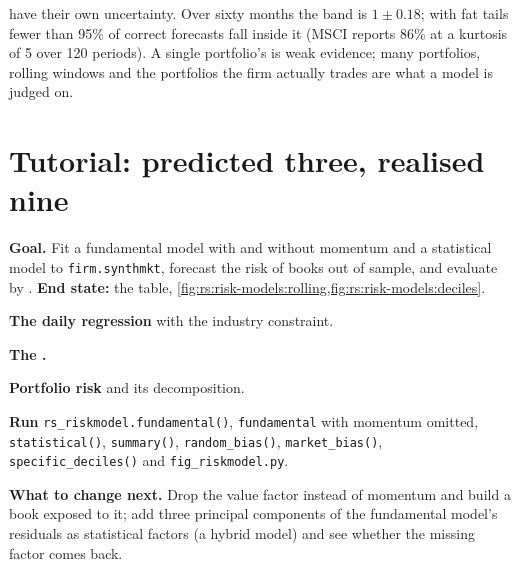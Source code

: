  have their own uncertainty. Over sixty months the band is $1 \pm 0.18$; with fat tails fewer than 95\% of correct forecasts fall inside it
(MSCI reports 86\% at a kurtosis of 5 over 120 periods). A single portfolio's  is weak evidence; many portfolios, rolling windows and the
portfolios the firm actually trades are what a model is judged on.

\section{Tutorial: predicted three, realised nine}\label{tut:rs:risk-models:tut}

\begin{tutorial}
\textbf{Goal.} Fit a fundamental model with and without momentum and a statistical model to \texttt{firm.synthmkt}, forecast the risk of books out of sample,
and evaluate by . \textbf{End state:} the table, \cref{fig:rs:risk-models:rolling,fig:rs:risk-models:deciles}.
\begin{tutsteps}
\item \textbf{The daily regression} with the industry constraint.
\label{lst:rs:risk-models:csreg}
\item \textbf{The .}
\label{lst:rs:risk-models:vra}
\item \textbf{Portfolio risk} and its decomposition.
\label{lst:rs:risk-models:risk}
\item \textbf{Run} \texttt{rs\_riskmodel.fundamental()}, \texttt{fundamental} with momentum omitted, \texttt{statistical()}, \texttt{summary()}, \texttt{random\_bias()},
\texttt{market\_bias()}, \texttt{specific\_deciles()} and \texttt{fig\_riskmodel.py}.
\end{tutsteps}
\textbf{What to change next.} Drop the value factor instead of momentum and build a book exposed to it; add three principal components of the fundamental
model's residuals as statistical factors (a hybrid model) and see whether the missing factor comes back.
\end{tutorial}

